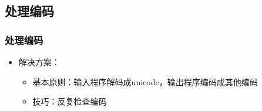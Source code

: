 \documentclass{beamer}
\begin{document}
\subsection{处理编码}
\begin{frame} 
\frametitle{处理编码}
\begin{itemize}
  \item 解决方案：
  \begin{itemize}
    \item 基本原则：输入程序解码成unicode，输出程序编码成其他编码
    \item 技巧：反复检查编码 
  \end{itemize}
\end{itemize}
\end{frame}

% 
% 
\end{document}
